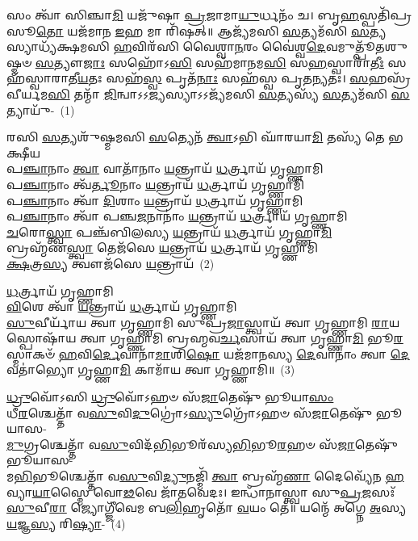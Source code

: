 \setcounter{anuvakam}{0}
𑌸𑌂 𑌤𑍍𑌵𑌾᳴ 𑌸𑌿𑌞𑍍𑌚𑌾\-\ul{𑌮𑌿} 𑌯𑌜𑍁᳴𑌷𑌾 \ul{𑌪𑍍𑌰}\-𑌜𑌾𑌮𑌾\-\ul{𑌯𑍁}\-𑌰𑍍𑌧𑌨𑌂᳴ 𑌚। 𑌬𑍃\-\ul{𑌹}\-𑌸𑍍𑌪𑌤𑌿᳴𑌪𑍍𑌰𑌸𑍂\-\ul{𑌤𑍋} 𑌯𑌜᳴𑌮𑌾𑌨 \ul{𑌇}\-𑌹 𑌮𑌾 𑌰𑌿᳴𑌷𑌤𑍍॥ 𑌆𑌜𑍍𑌯᳴𑌮𑌸𑌿 \ul{𑌸}\-𑌤𑍍𑌯𑌮᳴𑌸𑌿 \ul{𑌸}\-𑌤𑍍𑌯𑌸𑍍𑌯𑌾𑌧𑍍𑌯᳴𑌕𑍍𑌷𑌮𑌸𑌿 \ul{𑌹}\-𑌵𑌿𑌰᳴𑌸𑌿 𑌵𑍈𑌶𑍍𑌵𑌾\-\ul{𑌨}\-𑌰𑌂 𑌵𑍈॑𑌶𑍍𑌵\-\ul{𑌦𑍇}\-𑌵𑌮𑍁𑌤𑍍𑌪𑍂᳴𑌤𑌶𑍁𑌷𑍍𑌮𑍞 \ul{𑌸}\-𑌤𑍍𑌯𑍗\-\ul{𑌜𑌾𑌃} 𑌸𑌹𑍋᳴\-𑌽\-\ul{𑌸𑌿} 𑌸𑌹᳴𑌮𑌾𑌨𑌮\-\ul{𑌸𑌿} 𑌸\-\ul{𑌹}\-𑌸𑍍𑌵𑌾𑌰𑌾᳴\-\ul{𑌤𑍀𑌃} 𑌸𑌹᳴𑌸𑍍𑌵𑌾𑌰𑌾𑌤𑍀\-\ul{𑌯}\-𑌤𑌃 𑌸𑌹᳴\-\ul{𑌸𑍍𑌵} 𑌪𑍃𑌤᳴\-\ul{𑌨𑌾𑌃} 𑌸𑌹᳴𑌸𑍍𑌵 𑌪𑍃𑌤\-\ul{𑌨𑍍𑌯}\-𑌤𑌃। \ul{𑌸}\-𑌹𑌸𑍍𑌰᳴𑌵𑍀𑌰𑍍𑌯𑌮\-\ul{𑌸𑌿} 𑌤𑌨𑍍𑌮𑌾᳴ \ul{𑌜𑌿}\-𑌨𑍍𑌵𑌾\-𑌽\-𑌽\-\ul{𑌜𑍍𑌯}\-𑌸𑍍𑌯𑌾\-𑌽\-𑌽𑌜𑍍𑌯᳴𑌮𑌸𑌿 \ul{𑌸}\-𑌤𑍍𑌯𑌸𑍍𑌯᳴ \ul{𑌸}\-𑌤𑍍𑌯𑌮᳴𑌸𑌿 \ul{𑌸}\-𑌤𑍍𑌯𑌾𑌯𑍁᳴-~(1)

𑌰𑌸𑌿 \ul{𑌸}\-𑌤𑍍𑌯𑌶𑍁᳴𑌷𑍍𑌮𑌮𑌸𑌿 \ul{𑌸}\-𑌤𑍍𑌯𑍇𑌨᳴ \ul{𑌤𑍍𑌵𑌾}\-\-𑌽𑌭𑌿 𑌘𑌾᳴𑌰𑌯𑌾\-\ul{𑌮𑌿} 𑌤𑌸𑍍𑌯᳴ 𑌤𑍇 𑌭𑌕𑍍𑌷𑍀𑌯\\
𑌪\-\ul{𑌞𑍍𑌚𑌾}\-𑌨𑌾𑌂 \ul{𑌤𑍍𑌵𑌾} 𑌵𑌾𑌤𑌾᳴𑌨𑌾𑌂 \ul{𑌯}\-𑌨𑍍𑌤𑍍𑌰𑌾𑌯᳴ \ul{𑌧}\-𑌰𑍍𑌤𑍍𑌰𑌾𑌯᳴ 𑌗𑍃𑌹𑍍𑌣𑌾𑌮𑌿\\
𑌪\-\ul{𑌞𑍍𑌚𑌾}\-𑌨𑌾𑌂 𑌤𑍍𑌵᳴\-\ul{𑌰𑍍𑌤𑍂}\-𑌨𑌾𑌂 \ul{𑌯}\-𑌨𑍍𑌤𑍍𑌰𑌾𑌯᳴ \ul{𑌧}\-𑌰𑍍𑌤𑍍𑌰𑌾𑌯᳴ 𑌗𑍃𑌹𑍍𑌣𑌾𑌮𑌿\\
𑌪\-\ul{𑌞𑍍𑌚𑌾}\-𑌨𑌾𑌂 𑌤𑍍𑌵𑌾᳴ \ul{𑌦𑌿}\-𑌶𑌾𑌂 \ul{𑌯}\-𑌨𑍍𑌤𑍍𑌰𑌾𑌯᳴ \ul{𑌧}\-𑌰𑍍𑌤𑍍𑌰𑌾𑌯᳴ 𑌗𑍃𑌹𑍍𑌣𑌾𑌮𑌿\\
𑌪\-\ul{𑌞𑍍𑌚𑌾}\-𑌨𑌾𑌂 𑌤𑍍𑌵𑌾᳴ 𑌪𑌞𑍍𑌚\-\ul{𑌜}\-𑌨𑌾𑌨𑌾𑌂॑ \ul{𑌯}\-𑌨𑍍𑌤𑍍𑌰𑌾𑌯᳴ \ul{𑌧}\-𑌰𑍍𑌤𑍍𑌰𑌾𑌯᳴ 𑌗𑍃𑌹𑍍𑌣𑌾𑌮𑌿\\
\-\ul{𑌚}\-𑌰𑍋\-\ul{𑌸𑍍𑌤𑍍𑌵𑌾} 𑌪𑌞𑍍𑌚᳴𑌬𑌿𑌲𑌸𑍍𑌯 \ul{𑌯}\-𑌨𑍍𑌤𑍍𑌰𑌾𑌯᳴ \ul{𑌧}\-𑌰𑍍𑌤𑍍𑌰𑌾𑌯᳴ 𑌗𑍃𑌹𑍍𑌣𑌾\-\ul{𑌮𑌿}\-\\
𑌬𑍍𑌰𑌹𑍍𑌮᳴𑌣\-\ul{𑌸𑍍𑌤𑍍𑌵𑌾} 𑌤𑍇𑌜᳴𑌸𑍇 \ul{𑌯}\-𑌨𑍍𑌤𑍍𑌰𑌾𑌯᳴ \ul{𑌧}\-𑌰𑍍𑌤𑍍𑌰𑌾𑌯᳴ 𑌗𑍃𑌹𑍍𑌣𑌾𑌮𑌿\\
\-\ul{𑌕𑍍𑌷}\-𑌤𑍍𑌰\-\ul{𑌸𑍍𑌯} 𑌤𑍍𑌵𑍗𑌜᳴𑌸𑍇 \ul{𑌯}\-𑌨𑍍𑌤𑍍𑌰𑌾𑌯᳴~(2)

\-\ul{𑌧}\-𑌰𑍍𑌤𑍍𑌰𑌾𑌯᳴ 𑌗𑍃𑌹𑍍𑌣𑌾𑌮𑌿\\
\-\ul{𑌵𑌿}\-𑌶𑍇 𑌤𑍍𑌵𑌾᳴ \ul{𑌯}\-𑌨𑍍𑌤𑍍𑌰𑌾𑌯᳴ \ul{𑌧}\-𑌰𑍍𑌤𑍍𑌰𑌾𑌯᳴ 𑌗𑍃𑌹𑍍𑌣𑌾𑌮𑌿\\
\-\ul{𑌸𑍁}\-𑌵𑍀𑌰𑍍𑌯𑌾᳴𑌯 𑌤𑍍𑌵𑌾 𑌗𑍃𑌹𑍍𑌣𑌾𑌮𑌿 𑌸𑍁𑌪𑍍𑌰\-\ul{𑌜𑌾}\-𑌸𑍍𑌤𑍍𑌵𑌾𑌯᳴ 𑌤𑍍𑌵𑌾 𑌗𑍃𑌹𑍍𑌣𑌾𑌮𑌿 \ul{𑌰𑌾}\-𑌯𑌸𑍍𑌪𑍋𑌷𑌾᳴𑌯 𑌤𑍍𑌵𑌾 𑌗𑍃𑌹𑍍𑌣𑌾𑌮𑌿 𑌬𑍍𑌰𑌹𑍍𑌮𑌵\-\ul{𑌰𑍍𑌚}\-𑌸𑌾𑌯᳴ 𑌤𑍍𑌵𑌾 𑌗𑍃𑌹𑍍𑌣𑌾\-\ul{𑌮𑌿} 𑌭𑍂\-\ul{𑌰}\-𑌸𑍍𑌮𑌾𑌕𑍞᳴ \ul{𑌹}\-𑌵𑌿\-\ul{𑌰𑍍𑌦𑍇}\-𑌵𑌾𑌨𑌾᳴\-\ul{𑌮𑌾}\-𑌶𑌿\-\ul{𑌷𑍋} 𑌯𑌜᳴𑌮𑌾𑌨𑌸𑍍𑌯 \ul{𑌦𑍇}\-𑌵𑌾𑌨𑌾𑌂॑ 𑌤𑍍𑌵𑌾 \ul{𑌦𑍇}\-𑌵𑌤𑌾॑𑌭𑍍𑌯𑍋 𑌗𑍃𑌹𑍍𑌣𑌾\-\ul{𑌮𑌿} 𑌕𑌾𑌮𑌾᳴𑌯 𑌤𑍍𑌵𑌾 𑌗𑍃𑌹𑍍𑌣𑌾𑌮𑌿॥~(3)

{\anuvakamend[{\-\ul{𑌸}\-𑌤𑍍𑌯𑌾\-\ul{𑌯𑍁}\-𑌰𑍋𑌜᳴𑌸𑍇 \ul{𑌯}\-𑌨𑍍𑌤𑍍𑌰𑌾\-\ul{𑌯} 𑌤𑍍𑌰𑌯᳴𑌸𑍍𑌤𑍍𑌰𑌿𑍞𑌶𑌚𑍍𑌚}]}%

\-\ul{𑌧𑍍𑌰𑍁}\-𑌵𑍋᳴\-𑌽𑌸𑌿 \ul{𑌧𑍍𑌰𑍁}\-𑌵𑍋᳴\-𑌽𑌹𑍞 𑌸᳴\-\ul{𑌜𑌾}\-𑌤𑍇𑌷𑍁᳴ 𑌭𑍂𑌯𑌾\-\ul{𑌸𑌂}\-\\
𑌧𑍀\-\ul{𑌰}\-𑌶𑍍𑌚𑍇𑌤𑍍𑌤𑌾᳴ 𑌵\-\ul{𑌸𑍁}\-𑌵𑌿\-\ul{𑌦𑍁}\-𑌗𑍍𑌰𑍋॑\-𑌽\-\ul{𑌸𑍍𑌯𑍁}\-𑌗𑍍𑌰𑍋᳴\-𑌽𑌹𑍞 𑌸᳴\-\ul{𑌜𑌾}\-𑌤𑍇𑌷𑍁᳴ 𑌭𑍂𑌯𑌾𑌸-\\
\-\ul{𑌮𑍁}\-𑌗𑍍𑌰𑌶𑍍𑌚𑍇𑌤𑍍𑌤𑌾᳴ 𑌵\-\ul{𑌸𑍁}\-𑌵𑌿𑌦᳴\-\ul{𑌭𑌿}\-𑌭𑍂𑌰᳴𑌸𑍍𑌯\-\ul{𑌭𑌿}\-𑌭𑍂\-\ul{𑌰}\-𑌹𑍞 𑌸᳴\-\ul{𑌜𑌾}\-𑌤𑍇𑌷𑍁᳴ 𑌭𑍂𑌯𑌾𑌸-\\
𑌮\-\ul{𑌭𑌿}\-𑌭𑍂𑌶𑍍𑌚𑍇𑌤𑍍𑌤𑌾᳴ 𑌵\-\ul{𑌸𑍁}\-𑌵𑌿\-\ul{𑌦𑍍𑌯𑍁}\-𑌨𑌜𑍍𑌮𑌿᳴ \ul{𑌤𑍍𑌵𑌾} 𑌬𑍍𑌰𑌹𑍍𑌮᳴\-\ul{𑌣𑌾} 𑌦𑍈𑌵𑍍𑌯𑍇᳴𑌨 \ul{𑌹}\-𑌵𑍍𑌯𑌾\-\ul{𑌯𑌾}\-𑌸𑍍𑌮𑍈 𑌵𑍋\-\ul{𑌢}\-𑌵𑍇 𑌜𑌾᳴𑌤𑌵𑍇𑌦𑌃। 𑌇𑌨𑍍𑌧𑌾᳴𑌨𑌾𑌸𑍍𑌤𑍍𑌵𑌾 𑌸𑍁\-\ul{𑌪𑍍𑌰}\-𑌜𑌸𑌃᳴ \ul{𑌸𑍁}\-𑌵𑍀\-\ul{𑌰𑌾} 𑌜𑍍𑌯𑍋𑌗𑍍𑌜𑍀᳴𑌵𑍇𑌮 𑌬\-\ul{𑌲𑌿}\-𑌹𑍃𑌤𑍋᳴ \ul{𑌵}\-𑌯𑌂 𑌤𑍇॑॥ 𑌯𑌨𑍍𑌮𑍇᳴ 𑌅𑌗𑍍𑌨𑍇 \ul{𑌅}\-𑌸𑍍𑌯 \ul{𑌯}\-𑌜𑍍𑌞\-\ul{𑌸𑍍𑌯} 𑌰𑌿\-\ul{𑌷𑍍𑌯𑌾}\--~(4)

